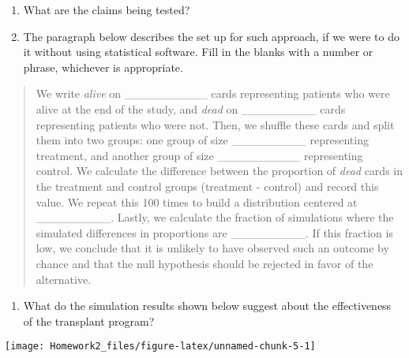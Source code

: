 \documentclass[]{article}
\providecommand{\tightlist}{%
  \setlength{\itemsep}{0pt}\setlength{\parskip}{0pt}}
\begin{document}
\begin{enumerate}
\def\labelenumi{\roman{enumi}.}
\tightlist
\item
  What are the claims being tested?
\item
  The paragraph below describes the set up for such approach, if we were
  to do it without using statistical software. Fill in the blanks with a
  number or phrase, whichever is appropriate.
\end{enumerate}

\begin{quote}
We write \emph{alive} on \_\_\_\_\_\_\_\_\_\_ cards representing
patients who were alive at the end of the study, and \emph{dead} on
\_\_\_\_\_\_\_\_\_ cards representing patients who were not. Then, we
shuffle these cards and split them into two groups: one group of size
\_\_\_\_\_\_\_\_\_ representing treatment, and another group of size
\_\_\_\_\_\_\_\_\_\_ representing control. We calculate the difference
between the proportion of \emph{dead} cards in the treatment and control
groups (treatment - control) and record this value. We repeat this 100
times to build a distribution centered at \_\_\_\_\_\_\_\_\_. Lastly, we
calculate the fraction of simulations where the simulated differences in
proportions are \_\_\_\_\_\_\_\_\_. If this fraction is low, we conclude
that it is unlikely to have observed such an outcome by chance and that
the null hypothesis should be rejected in favor of the alternative.
\end{quote}

\begin{enumerate}
\def\labelenumi{\roman{enumi}.}
\setcounter{enumi}{2}
\tightlist
\item
  What do the simulation results shown below suggest about the
  effectiveness of the transplant program?
\end{enumerate}

\begin{center}

\texttt{[image: Homework2\_files/figure-latex/unnamed-chunk-5-1]} 
\end{center}
\end{document}
